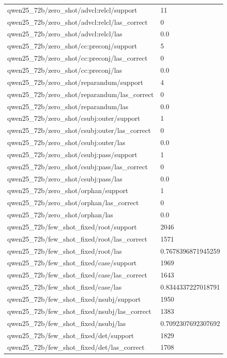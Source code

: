 \begin{tabular}{ll}
qwen25\_72b/zero\_shot/advcl:relcl/support & 11 \\
qwen25\_72b/zero\_shot/advcl:relcl/las\_correct & 0 \\
qwen25\_72b/zero\_shot/advcl:relcl/las & 0.0 \\
qwen25\_72b/zero\_shot/cc:preconj/support & 5 \\
qwen25\_72b/zero\_shot/cc:preconj/las\_correct & 0 \\
qwen25\_72b/zero\_shot/cc:preconj/las & 0.0 \\
qwen25\_72b/zero\_shot/reparandum/support & 4 \\
qwen25\_72b/zero\_shot/reparandum/las\_correct & 0 \\
qwen25\_72b/zero\_shot/reparandum/las & 0.0 \\
qwen25\_72b/zero\_shot/csubj:outer/support & 1 \\
qwen25\_72b/zero\_shot/csubj:outer/las\_correct & 0 \\
qwen25\_72b/zero\_shot/csubj:outer/las & 0.0 \\
qwen25\_72b/zero\_shot/csubj:pass/support & 1 \\
qwen25\_72b/zero\_shot/csubj:pass/las\_correct & 0 \\
qwen25\_72b/zero\_shot/csubj:pass/las & 0.0 \\
qwen25\_72b/zero\_shot/orphan/support & 1 \\
qwen25\_72b/zero\_shot/orphan/las\_correct & 0 \\
qwen25\_72b/zero\_shot/orphan/las & 0.0 \\
qwen25\_72b/few\_shot\_fixed/root/support & 2046 \\
qwen25\_72b/few\_shot\_fixed/root/las\_correct & 1571 \\
qwen25\_72b/few\_shot\_fixed/root/las & 0.7678396871945259 \\
qwen25\_72b/few\_shot\_fixed/case/support & 1969 \\
qwen25\_72b/few\_shot\_fixed/case/las\_correct & 1643 \\
qwen25\_72b/few\_shot\_fixed/case/las & 0.8344337227018791 \\
qwen25\_72b/few\_shot\_fixed/nsubj/support & 1950 \\
qwen25\_72b/few\_shot\_fixed/nsubj/las\_correct & 1383 \\
qwen25\_72b/few\_shot\_fixed/nsubj/las & 0.7092307692307692 \\
qwen25\_72b/few\_shot\_fixed/det/support & 1829 \\
qwen25\_72b/few\_shot\_fixed/det/las\_correct & 1708 \\

\end{tabular}
